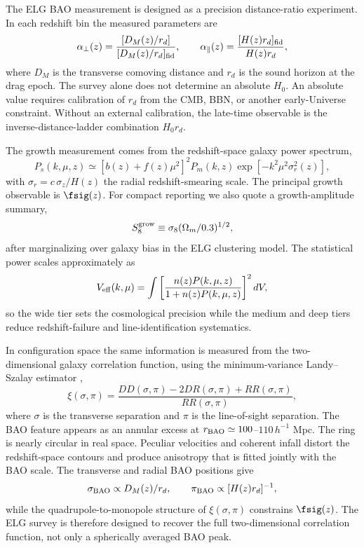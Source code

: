 The ELG BAO measurement is designed as a precision distance-ratio experiment. In each redshift bin the measured parameters are
\begin{equation}
  \alpha_\perp(z)=
  \frac{[D_M(z)/r_d]}{[D_M(z)/r_d]_{\rm fid}},\qquad
  \alpha_\parallel(z)=
  \frac{[H(z)r_d]_{\rm fid}}{H(z)r_d},
\end{equation}
where $D_M$ is the transverse comoving distance and $r_d$ is the sound horizon at the drag epoch. The survey alone does not determine an absolute $H_0$. An absolute value requires calibration of $r_d$ from the CMB, BBN, or another early-Universe constraint. Without an external calibration, the late-time observable is the inverse-distance-ladder combination $H_0r_d$.

The growth measurement comes from the redshift-space galaxy power spectrum,
\begin{equation}
  P_s(k,\mu,z)\simeq
  \left[b(z)+f(z)\mu^2\right]^2 P_m(k,z)
  \exp\!\left[-k^2\mu^2\sigma_r^2(z)\right],
\end{equation}
with $\sigma_r=c\,\sigma_z/H(z)$ the radial redshift-smearing scale. The principal growth observable is $\fsig(z)$. For compact reporting we also quote a growth-amplitude summary,
\begin{equation}
  S_8^{\rm grow}\equiv \sigma_8(\Omega_m/0.3)^{1/2},
\end{equation}
after marginalizing over galaxy bias in the ELG clustering model. The statistical power scales approximately as
\begin{equation}
  V_{\rm eff}(k,\mu)=
  \int \left[\frac{n(z)P(k,\mu,z)}{1+n(z)P(k,\mu,z)}\right]^2 dV,
  \label{eq:veff}
\end{equation}
so the wide tier sets the cosmological precision while the medium and deep tiers reduce redshift-failure and line-identification systematics.

In configuration space the same information is measured from the two-dimensional galaxy correlation function, using the minimum-variance Landy--Szalay estimator \cite{landyszalay1993},
\begin{equation}
  \xi(\sigma,\pi)=\frac{DD(\sigma,\pi)-2DR(\sigma,\pi)+RR(\sigma,\pi)}
  {RR(\sigma,\pi)},
  \label{eq:xiestimator}
\end{equation}
where $\sigma$ is the transverse separation and $\pi$ is the line-of-sight separation. The BAO feature appears as an annular excess at $r_{\rm BAO}\simeq100$--$110\,h^{-1}$ Mpc. The ring is nearly circular in real space. Peculiar velocities and coherent infall distort the redshift-space contours and produce anisotropy that is fitted jointly with the BAO scale. The transverse and radial BAO positions give
\begin{equation}
  \sigma_{\rm BAO}\propto D_M(z)/r_d,\qquad
  \pi_{\rm BAO}\propto [H(z)r_d]^{-1},
\end{equation}
while the quadrupole-to-monopole structure of $\xi(\sigma,\pi)$ constrains $\fsig(z)$. The ELG survey is therefore designed to recover the full two-dimensional correlation function, not only a spherically averaged BAO peak.

